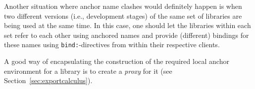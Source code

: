 Another situation where anchor name clashes would definitely happen is
when two different versions (i.e., development stages) of the same set
of libraries are being used at the same time.  In this case, one
should let the libraries within each set refer to each other using
anchored names and provide (different) bindings for these names using
{\tt bind:}-directives from within their respective clients.

A good way of encapsulating the construction of the required local
anchor environment for a library is to create a {\em proxy} for it
(see Section~\ref{sec:exportcalculus}).
